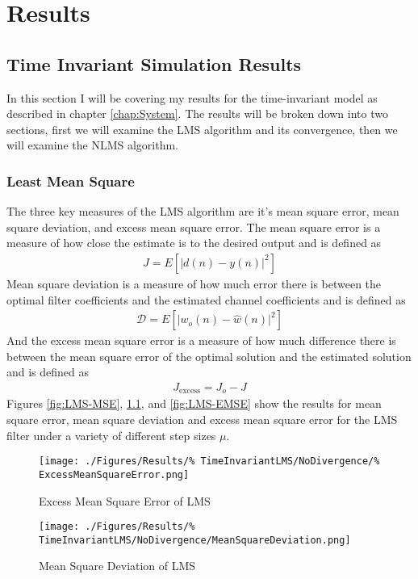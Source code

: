 \chapter{Results}
\label{chap:Results}
\section{Time Invariant Simulation Results}
In this section I will be covering my results for the time-invariant %
model as described in chapter \ref{chap:System}. The results will be %
broken down into two sections, first we will examine the %
LMS algorithm and its convergence, then we will examine the NLMS %
algorithm.

\subsection{Least Mean Square}
\FloatBarrier
The three key measures of the LMS algorithm are it's mean square %
error, mean square deviation, and excess mean square error. %
The mean square error is a measure of how close the estimate %
is to the desired output and is defined as 
\begin{align}
	J = E\left[ \lvert d(n) - y(n) \rvert^{2} \right]
\end{align}
Mean square deviation is a measure of how much error there is %
between the optimal filter coefficients and the estimated %
channel coefficients and is defined as
\begin{align}
	\mathscr{D} = E\left[ \lvert w_{o}(n) - \hat{w}(n) \rvert^{2} \right]
\end{align}
And the excess mean square error is a measure of how much %
difference there is between the mean square error of the %
optimal solution and the estimated solution and is defined as
\begin{align}
	J_{\text{excess}} = J_{o} - J
\end{align}
Figures \ref{fig:LMS-MSE}, \ref{fig:LMS-MSD}, and \ref{fig:LMS-EMSE} %
show the results for mean square error, mean square deviation and %
excess mean square error for the LMS filter under a variety of %
different step sizes $\mu$.
\begin{figure}[ht]
	\centering
	\begin{minipage}{0.49\textwidth}
		\centering
		\texttt{[image: ./Figures/Results/\%
		TimeInvariantLMS/NoDivergence/\%
		ExcessMeanSquareError.png]}
		\caption{Excess Mean Square Error of LMS}
		\label{fig:LMS-EMSE}
	\end{minipage}
	\begin{minipage}{0.49\textwidth}
		\centering
		\texttt{[image: ./Figures/Results/\%
		TimeInvariantLMS/NoDivergence/MeanSquareDeviation.png]}
		\caption{Mean Square Deviation of LMS}
		\label{fig:LMS-MSD}
	\end{minipage}
\end{figure}
